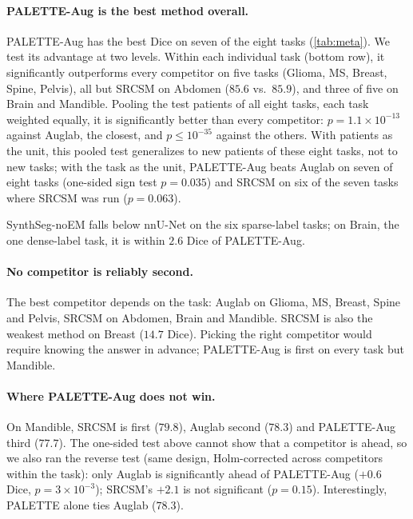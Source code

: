 \paragraph{PALETTE-Aug is the best method overall.} PALETTE-Aug has the best
Dice on seven of the eight tasks (\cref{tab:meta}). We test its advantage at
two levels. Within each individual task (bottom row), it significantly
outperforms every competitor on five tasks (Glioma, MS, Breast, Spine,
Pelvis), all but SRCSM on Abdomen ($85.6$ vs.\ $85.9$), and three of five on
Brain and Mandible. Pooling the test patients of all eight tasks, each task
weighted equally, it is significantly better than every competitor:
$p=1.1\times10^{-13}$ against Auglab, the closest, and $p\le10^{-35}$ against
the others. With patients as the unit, this pooled test generalizes to new
patients of these eight tasks, not to new tasks; with the task as the unit,
PALETTE-Aug beats Auglab on seven of eight tasks (one-sided sign test
$p=0.035$) and SRCSM on six of the seven tasks where SRCSM was run
($p=0.063$).

SynthSeg-noEM falls below nnU-Net on the six sparse-label tasks; on Brain,
the one dense-label task, it is within $2.6$ Dice of PALETTE-Aug.

\paragraph{No competitor is reliably second.} The best competitor depends on
the task: Auglab on Glioma, MS, Breast, Spine and Pelvis, SRCSM on Abdomen,
Brain and Mandible. SRCSM is also the weakest method on Breast ($14.7$ Dice).
Picking the right competitor would require knowing the answer in advance;
PALETTE-Aug is first on every task but Mandible.

\paragraph{Where PALETTE-Aug does not win.} On Mandible, SRCSM is first
($79.8$), Auglab second ($78.3$) and PALETTE-Aug third ($77.7$). The one-sided
test above cannot show that a competitor is ahead, so we also ran the reverse
test (same design, Holm-corrected across competitors within the task): only
Auglab is significantly ahead of PALETTE-Aug ($+0.6$ Dice,
$p=3\times10^{-3}$); SRCSM's $+2.1$ is not significant ($p=0.15$).
Interestingly, PALETTE alone ties Auglab ($78.3$).

